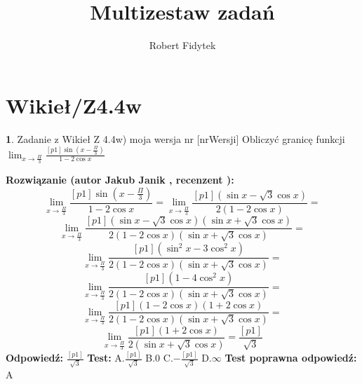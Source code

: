 \documentclass[12pt, a4paper]{article}
\title{Multizestaw zadań}
\author{Robert Fidytek}
\date{}
\theoremstyle{definition} %
\newtheorem{zad}{}
\newcommand{\kategoria}[1]{\section{#1}} %
\newcommand{\zadStart}[1]{\begin{zad}#1\newline} %
\newcommand{\zadStop}{\end{zad}}   %
\newcommand{\rozwStart}[2]{\noindent \textbf{Rozwiązanie (autor #1 , recenzent #2): }\newline} %
\newcommand{\rozwStop}{\newline}                                            %
\newcommand{\odpStart}{\noindent \textbf{Odpowiedź:}\newline}    %
\newcommand{\odpStop}{\newline}                                             %
\newcommand{\testStart}{\noindent \textbf{Test:}\newline} %
\newcommand{\testStop}{\newline} %
\newcommand{\kluczStart}{\noindent \textbf{Test poprawna odpowiedź:}\newline} %
\newcommand{\kluczStop}{\newline} %
\begin{document}
\maketitle


\kategoria{Wikieł/Z4.4w}
\zadStart{Zadanie z Wikieł Z 4.4w) moja wersja nr [nrWersji]}
Obliczyć granicę funkcji $\lim_{x \to \frac{\Pi}{3}} \frac{[p1]\sin({x-\frac{\Pi}{3}})}{1-2\cos{x}}$
\zadStop
\rozwStart{Jakub Janik}{}
$$\lim_{x \to \frac{\Pi}{3}} \frac{[p1]\sin({x-\frac{\Pi}{3}})}{1-2\cos{x}}=\lim_{x \to \frac{\Pi}{3}} \frac{[p1](\sin{x}-\sqrt{3}\cos{x})}{2(1-2\cos{x})}=$$
$$\lim_{x \to \frac{\Pi}{3}} \frac{[p1](\sin{x}-\sqrt{3}\cos{x})(\sin{x}+\sqrt{3}\cos{x})}{2(1-2\cos{x})(\sin{x}+\sqrt{3}\cos{x})}=$$
$$\lim_{x \to \frac{\Pi}{3}} \frac{[p1](\sin^2{x}-3\cos^2{x})}{2(1-2\cos{x})(\sin{x}+\sqrt{3}\cos{x})}=$$
$$\lim_{x \to \frac{\Pi}{3}} \frac{[p1](1-4\cos^2{x})}{2(1-2\cos{x})(\sin{x}+\sqrt{3}\cos{x})}=$$
$$\lim_{x \to \frac{\Pi}{3}} \frac{[p1](1-2\cos{x})(1+2\cos{x})}{2(1-2\cos{x})(\sin{x}+\sqrt{3}\cos{x})}=$$
$$\lim_{x \to \frac{\Pi}{3}} \frac{[p1](1+2\cos{x})}{2(\sin{x}+\sqrt{3}\cos{x})}=\frac{[p1]}{\sqrt{3}}$$
\rozwStop
\odpStart
$\frac{[p1]}{\sqrt{3}}$
\odpStop
\testStart
A.$\frac{[p1]}{\sqrt{3}}$
B.$0$
C.$-\frac{[p1]}{\sqrt{3}}$
D.$\infty$
\testStop
\kluczStart
A
\kluczStop
\end{document}
